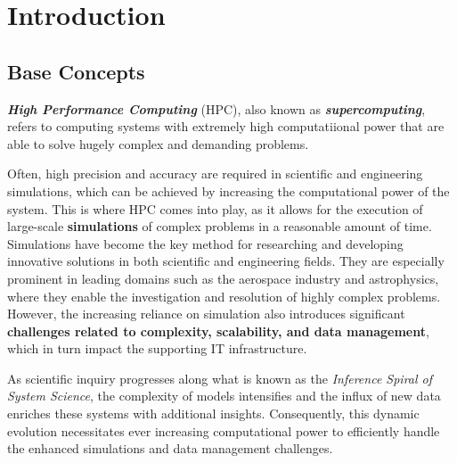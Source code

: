 \chapter{Introduction}

\section{Base Concepts} \label{sec:base_concepts}

\textbf{\textit{High Performance Computing}} (HPC), also known as \textbf{\textit{supercomputing}}, refers to computing systems with extremely high computatiional power that are able to solve hugely complex and demanding problems. \cite{europaHighPerformance}

Often, high precision and accuracy are required in scientific and engineering simulations, which can be achieved by increasing the computational power of the system. This is where HPC comes into play, as it allows for the execution of large-scale \textbf{simulations} of complex problems in a reasonable amount of time. Simulations have become the key method for researching and developing innovative solutions in both scientific and engineering fields. They are especially prominent in leading domains such as the aerospace industry and astrophysics, where they enable the investigation and resolution of highly complex problems. However, the increasing reliance on simulation also introduces significant \textbf{challenges related to complexity, scalability, and data management}, which in turn impact the supporting IT infrastructure.

As scientific inquiry progresses along what is known as the \textit{Inference Spiral of System Science}, the complexity of models intensifies and the influx of new data enriches these systems with additional insights. Consequently, this dynamic evolution necessitates ever increasing computational power to efficiently handle the enhanced simulations and data management challenges.

